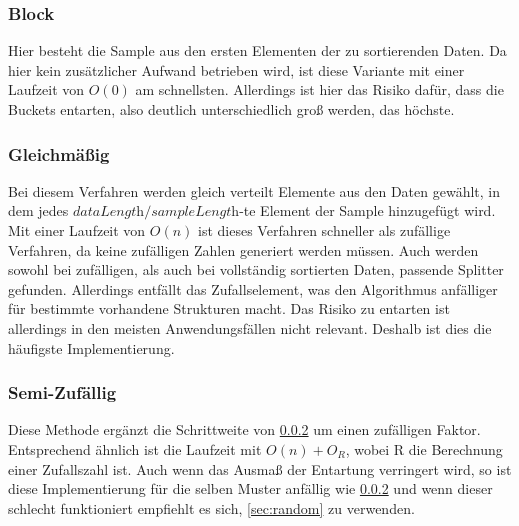 		\subsubsection{Block}
			\label{sec:block}
			
			Hier besteht die Sample aus den ersten Elementen der zu sortierenden Daten.
			Da hier kein zusätzlicher Aufwand betrieben wird, ist diese Variante mit einer Laufzeit von $O(0)$ am schnellsten.
			Allerdings ist hier das Risiko dafür, dass die Buckets entarten, also deutlich unterschiedlich groß werden, das höchste.

		\subsubsection{Gleichmäßig}
			\label{sec:even}
			
			Bei diesem Verfahren werden gleich verteilt Elemente aus den Daten gewählt, in dem jedes $\textit{dataLength}/\textit{sampleLength}$-te Element der Sample hinzugefügt wird.\\
			Mit einer Laufzeit von $O(n)$ ist dieses Verfahren schneller als zufällige Verfahren, da keine zufälligen Zahlen generiert werden müssen.
			Auch werden sowohl bei zufälligen, als auch bei vollständig sortierten Daten, passende Splitter gefunden.
			Allerdings entfällt das Zufallselement, was den Algorithmus anfälliger für bestimmte vorhandene Strukturen macht.
			Das Risiko zu entarten ist allerdings in den meisten Anwendungsfällen nicht relevant.
			Deshalb ist dies die häufigste Implementierung.

		\subsubsection{Semi-Zufällig}
			\label{sec:semi-random}
			
			Diese Methode ergänzt die Schrittweite von \ref{sec:even} um einen zufälligen Faktor.
			Entsprechend ähnlich ist die Laufzeit mit $O(n)+O_R$, wobei R die Berechnung einer Zufallszahl ist.
			Auch wenn das Ausmaß der Entartung verringert wird, so ist diese Implementierung für die selben Muster anfällig wie \ref{sec:even} und wenn dieser schlecht funktioniert empfiehlt es sich, \ref{sec:random} zu verwenden.

